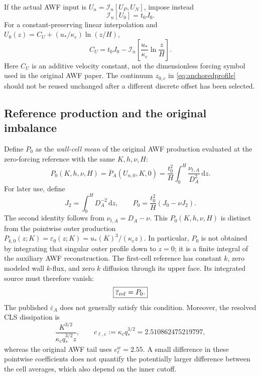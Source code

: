 \documentclass[11pt,a4paper]{article}
\numberwithin{equation}{section}
\newcommand{\dd}{\mathrm{d}}
\newcommand{\eps}{\varepsilon}
\newcommand{\ust}{u_*}
\newcommand{\kc}{\kappa_c}
\newcommand{\qs}{q_*}
\newcommand{\avg}[1]{\overline{#1}}
\begin{document}
If the actual AWF input is $U_n=\mathcal I_n[U_P,U_N]$, impose instead
\begin{equation}
 \boxed{\mathcal I_n[U_0]=t_0J_0.}
 \label{eq:discreteanchor}
\end{equation}
For a constant-preserving linear interpolation and
$U_0(z)=C_U+(\ust/\kc)\ln(z/H)$,
\begin{equation}
 C_U=t_0J_0-
 \mathcal I_n\!\left[\frac{\ust}{\kc}\ln\frac zH\right].
 \label{eq:CU}
\end{equation}
Here $C_U$ is an additive velocity constant, not the dimensionless
forcing symbol used in the original AWF paper.
The continuum $z_{0,c}$ in \cref{eq:anchoredprofile} should not be reused
unchanged after a different discrete offset has been selected.

\subsection{Reference production and the original imbalance}
Define $P_0$ as the \emph{wall-cell mean} of the original AWF production
evaluated at the zero-forcing reference with the same $K,h,\nu,H$:
\begin{equation}
 \boxed{P_0(K,h,\nu,H)=\avg P_A(U_{n,0},K,0)
 =\frac{t_0^2}{H}\int_0^H\frac{\nu_{t,A}}{D_A^2}\,\dd z.}
 \label{eq:P0}
\end{equation}
For later use, define
\begin{equation}
 J_2=\int_0^H D_A^{-2}\,\dd z,\qquad
 P_0=\frac{t_0^2}{H}(J_0-\nu J_2).
 \label{eq:J2}
\end{equation}
The second identity follows from $\nu_{t,A}=D_A-\nu$.
This $P_0(K,h,\nu,H)$ is distinct from the pointwise outer production
$P_{k,0}(z;K)=\eps_0(z;K)=\ust(K)^3/(\kc z)$. In particular,
$P_0$ is not obtained by integrating that singular outer profile down
to $z=0$; it is a finite integral of the auxiliary AWF reconstruction.
The first-cell reference has constant $k$, zero modeled wall $k$-flux,
and zero $k$ diffusion through its upper face. Its integrated source must
therefore vanish:
\begin{equation}
 \boxed{\avg\eps_{\rm ref}=P_0.}
 \label{eq:kbudget}
\end{equation}
The published $\avg\eps_A$ does not generally satisfy this condition.
Moreover, the resolved CLS dissipation is
\begin{equation}
 \frac{K^{3/2}}{\kc\qs^{3/2}z},\qquad
 c_{\ell,c}:=\kc\qs^{3/2}=2.510862475219797,
 \label{eq:clc}
\end{equation}
whereas the original AWF tail uses $c_\ell^w=2.55$. A small difference
in these pointwise coefficients does not quantify the potentially larger
difference between the cell averages, which also depend on the inner cutoff.
\end{document}
